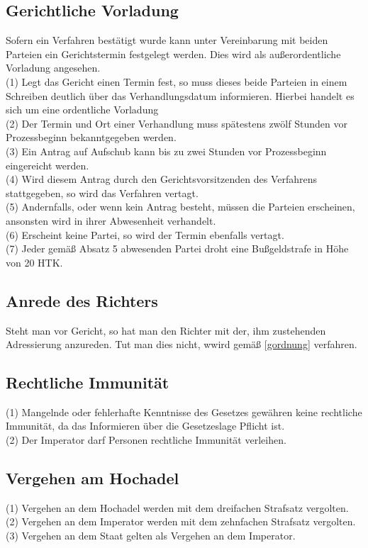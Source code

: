 \documentclass{article}
\begin{document}
\subsection{Gerichtliche Vorladung}
Sofern ein Verfahren bestätigt wurde kann unter Vereinbarung mit beiden Parteien ein Gerichtstermin festgelegt werden. Dies wird als außerordentliche Vorladung angesehen.\\
(1) Legt das Gericht einen Termin fest, so muss dieses beide Parteien in einem Schreiben deutlich über das Verhandlungsdatum informieren. Hierbei handelt es sich um eine ordentliche Vorladung\\
(2) Der Termin und Ort einer Verhandlung muss spätestens zwölf Stunden vor Prozessbeginn bekanntgegeben werden.\\
(3) Ein Antrag auf Aufschub kann bis zu zwei Stunden vor Prozessbeginn eingereicht werden.\\
(4) Wird diesem Antrag durch den Gerichtsvorsitzenden des Verfahrens stattgegeben, so wird das Verfahren vertagt.\\
(5) Andernfalls, oder wenn kein Antrag besteht, müssen die Parteien erscheinen, ansonsten wird in ihrer Abwesenheit verhandelt.\\
(6) Erscheint keine Partei, so wird der Termin ebenfalls vertagt.\\
(7) Jeder gemäß Absatz 5 abwesenden Partei droht eine Bußgeldstrafe in Höhe von 20 HTK.\\

\subsection{Anrede des Richters}
Steht man vor Gericht, so hat man den Richter mit der, ihm zustehenden Adressierung anzureden. Tut man dies nicht, wwird gemäß \ref{gordnung} verfahren.\\

\subsection{Rechtliche Immunität}
(1) Mangelnde oder fehlerhafte Kenntnisse des Gesetzes gewähren keine rechtliche Immunität, da das Informieren über die Gesetzeslage Pflicht ist.\\
(2) Der Imperator darf Personen rechtliche Immunität verleihen.

\subsection{Vergehen am Hochadel}\label{vergehen}
(1) Vergehen an dem Hochadel werden mit dem dreifachen Strafsatz vergolten.\\
(2) Vergehen an dem Imperator werden mit dem zehnfachen Strafsatz vergolten.\\
(3) Vergehen an dem Staat gelten als Vergehen an dem Imperator.
\end{document}
